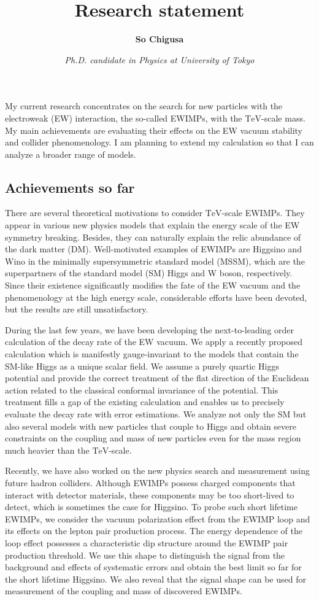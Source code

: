 \documentclass[12pt,notitlepage]{book}
\title{\vspace*{-3cm}Research statement}
\author{\textbf{So Chigusa}}
\date{\vspace*{-4mm}\textit{Ph.D. candidate in Physics at University of Tokyo}}
\begin{document}
\maketitle

My current research concentrates on the search for new particles with
the electroweak (EW) interaction, the so-called EWIMPs, with the
$\mathrm{TeV}$-scale mass.  My main achievements are evaluating their
effects on the EW vacuum stability and collider phenomenology.  I am
planning to extend my calculation so that I can analyze a broader range
of models.

\vspace*{-2mm}
\subsection*{Achievements so far}

There are several theoretical motivations to consider
$\mathrm{TeV}$-scale EWIMPs.  They appear in various new physics models
that explain the energy scale of the EW symmetry breaking.  Besides,
they can naturally explain the relic abundance of the dark matter (DM).
Well-motivated examples of EWIMPs are Higgsino and Wino in the minimally
supersymmetric standard model (MSSM), which are the superpartners of the
standard model (SM) Higgs and W boson, respectively.  Since their
existence significantly modifies the fate of the EW vacuum and the
phenomenology at the high energy scale, considerable efforts have been
devoted, but the results are still unsatisfactory.

During the last few years, we have been developing the next-to-leading
order calculation of the decay rate of the EW vacuum.  We apply a
recently proposed calculation which is manifestly gauge-invariant to the
models that contain the SM-like Higgs as a unique scalar field.  We
assume a purely quartic Higgs potential and provide the correct
treatment of the flat direction of the Euclidean action related to the
classical conformal invariance of the potential.  This treatment fills a
gap of the existing calculation and enables us to precisely evaluate the
decay rate with error estimations.  We analyze not only the SM but also
several models with new particles that couple to Higgs and obtain severe
constraints on the coupling and mass of new particles even for the mass
region much heavier than the $\mathrm{TeV}$-scale.

Recently, we have also worked on the new physics search and measurement
using future hadron colliders.  Although EWIMPs possess charged
components that interact with detector materials, these components may
be too short-lived to detect, which is sometimes the case for Higgsino.
To probe such short lifetime EWIMPs, we consider the vacuum polarization
effect from the EWIMP loop and its effects on the lepton pair production
process.  The energy dependence of the loop effect possesses a
characteristic dip structure around the EWIMP pair production threshold.
We use this shape to distinguish the signal from the background and
effects of systematic errors and obtain the best limit so far for the
short lifetime Higgsino.  We also reveal that the signal shape can be
used for measurement of the coupling and mass of discovered EWIMPs.
\end{document}
